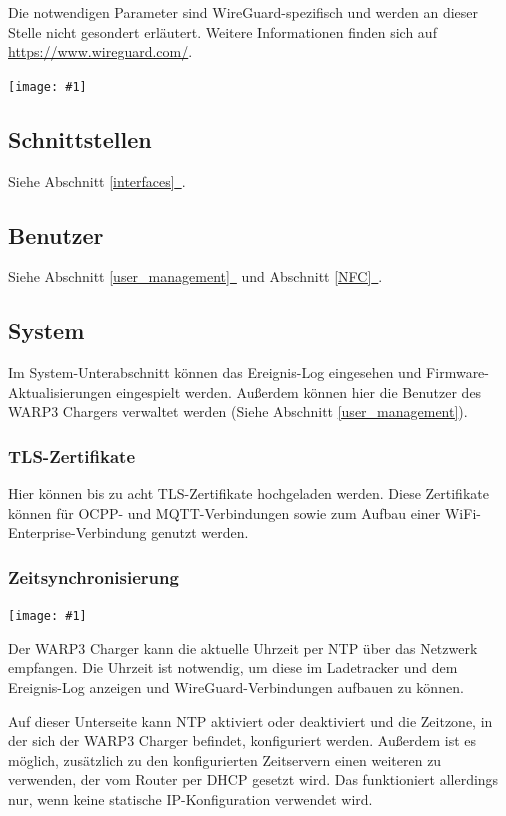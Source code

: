 \documentclass[a4paper,10pt]{article}
\newcommand{\gfx}[1]{\texttt{[image: \#1]}}
\newcommand*{\fullref}[1]{Abschnitt \hyperref[{#1}]{\ref*{#1}~\nameref*{#1}}}
\begin{document}
\begin{multicols*}{2}
    Die notwendigen Parameter sind WireGuard-spezifisch und werden an dieser Stelle
    nicht gesondert erläutert. Weitere Informationen finden sich auf\\
    \url{https://www.wireguard.com/}.

    \gfx{./img_warp3/resized/web_wireguard}

    \subsection{Schnittstellen}
    Siehe \fullref{interfaces}.

    \subsection{Benutzer}
    Siehe \fullref{user_management} und \fullref{NFC}.

    \subsection{System}
    Im System-Unterabschnitt können das Ereignis-Log eingesehen und
	Firmware-Aktualisierungen eingespielt werden.
    Außerdem können hier die Benutzer des WARP3 Chargers verwaltet werden (Siehe
    Abschnitt \ref{user_management}).

    \vspace{-0.2cm}
    \subsubsection{TLS-Zertifikate}\label{tls}
    Hier können bis zu acht TLS-Zertifikate hochgeladen werden. Diese Zertifikate können
    für OCPP- und MQTT-Verbindungen sowie zum Aufbau einer WiFi-Enterprise-Verbindung genutzt werden.

    \vspace{-0.2cm}
    \subsubsection{Zeitsynchronisierung}\label{ntp}

    \gfx{./img_warp3/resized/web_ntp}

    Der WARP3 Charger kann die aktuelle Uhrzeit per NTP über das Netzwerk empfangen.
    Die Uhrzeit ist notwendig, um diese im Ladetracker und dem Ereignis-Log anzeigen und
    WireGuard-Verbindungen aufbauen zu können.

    Auf dieser Unterseite kann NTP aktiviert oder deaktiviert und die Zeitzone, in der sich
    der WARP3 Charger befindet, konfiguriert werden. Außerdem ist es möglich, zusätzlich zu den konfigurierten Zeitservern einen weiteren zu verwenden, der vom Router per DHCP gesetzt wird. Das funktioniert allerdings nur, wenn keine statische IP-Konfiguration verwendet wird.


\end{multicols*}
\end{document}

